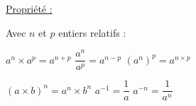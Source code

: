 \documentclass[12pt]{article}
\begin{document}
\vspace{5pt}
\begin{mdframed}[
    linewidth=1pt,
    roundcorner=5pt,
    linecolor=Red,
    innertopmargin=10pt,
    innerbottommargin=10pt
]
{\color{red}
\underline{Propriété :}

\vspace{5pt}
Avec $n$ et $p$ entiers relatifs :

\vspace{5pt}
\hspace{3cm} $a^n \times a^p = a^{n+p}$ \hspace{2cm} $\dfrac{a^n}{a^p} = a^{n-p}$ 
\hspace{2cm} $(a^n)^p = a^{n \times p}$

\vspace{10pt}
\hspace{3cm} $(a \times b)^n = a^n \times b^n$ \hspace{1.4cm} $a^{-1} = \dfrac{1}{a}$ 
\hspace{2.5cm} $a^{-n} = \dfrac{1}{a^n}$    
}
\end{mdframed}
\end{document}
